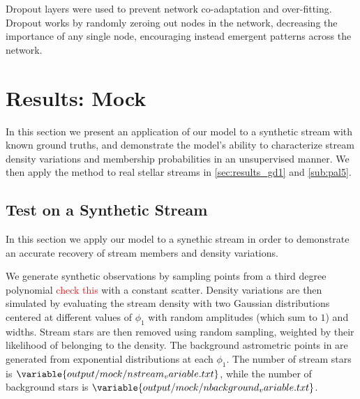 \documentclass[twocolumn]{aastex631}
\newcommand{\TODO}[1]{{\textcolor{red}{#1}}}
\newcommand{\JN}[1]{\TODO{#1}}
\begin{document}
        Dropout layers were used to prevent network co-adaptation and over-fitting. Dropout works by randomly zeroing out nodes in the network, decreasing the importance of any single node, encouraging instead emergent patterns across the network.

        

\section{Results: Mock} \label{sec:results_mock}

    In this section we present an application of our model to a synthetic stream with known ground truths, and demonstrate the model's ability to characterize stream density variations and membership probabilities in an unsupervised manner. We then apply the method to real stellar streams in \autoref{sec:results_gd1} and \autoref{sub:pal5}.

    \subsection{Test on a Synthetic Stream} \label{sub:mock_data}
    
        In this section we apply our model to a synethic stream in order to demonstrate an accurate recovery of stream members and density variations.
    
        We generate synthetic observations by sampling points from a third degree polynomial \JN{check this} with a constant scatter. Density variations are then simulated by evaluating the stream density with two Gaussian distributions centered at different values of $\phi_1$ with random amplitudes (which sum to $1$) and widths. Stream stars are then removed using random sampling, weighted by their likelihood of belonging to the density. The background astrometric  points in are generated from exponential distributions at each $\phi_1$. The number of stream stars is $\variable{output/mock/nstream_variable.txt}$, while the number of background stars is $\variable{output/mock/nbackground_variable.txt}$.
\end{document}
